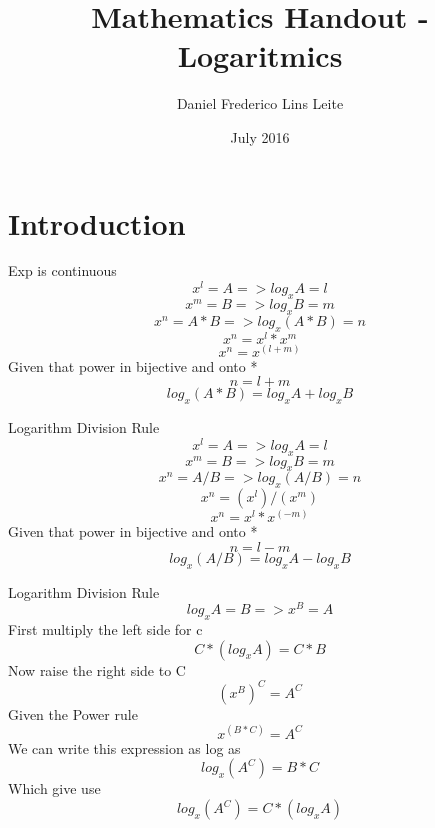 \documentclass[]{article}
\title{Mathematics Handout - Logaritmics}
\author{Daniel Frederico Lins Leite}
\date{July 2016}
\begin{document}
\maketitle

\section{Introduction}\label{introduction}

{Exp is continuous} \[x^l = A => log_x A = l\]
\[x^m = B => log_x B = m\] \[x^n = A*B => log_x(A*B) = n\]
\[x^n = x^l*x^m\] \[x^n = x^(l+m)\] Given that power in bijective and
onto * \[n = l+m\] \[log_x (A*B) = log_x A + log_x B\]

{Logarithm Division Rule} \[x^l = A => log_x A = l\]
\[x^m = B => log_x B = m\] \[x^n = A/B => log_x(A/B) = n\]
\[x^n = (x^l)/(x^m)\] \[x^n = x^l*x^(-m)\] Given that power in bijective
and onto * \[n=l-m\] \[log_x (A/B) = log_x A - log_x B\]

{Logarithm Division Rule} \[log_x A = B => x^B = A\] First multiply the
left side for c \[C*(log_x A) = C*B\] Now raise the right side to C
\[(x^B)^C =  A^C\] Given the Power rule \[x^(B*C) = A^C\] We can write
this expression as log as \[log_x (A^C) = B*C\] Which give use
\[log_x (A^C) = C*(log_x A)\]
\end{document}
